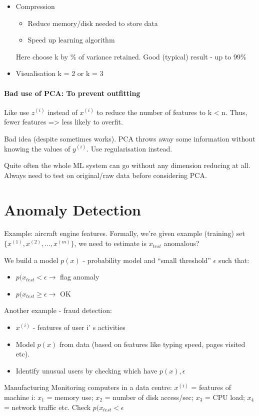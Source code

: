 \documentclass{scrartcl}
\begin{document}
\begin{itemize}
\item Compression
  \begin{itemize}
  \item Reduce memory/disk needed to store data
  \item Speed up learning algorithm
  \end{itemize}
  Here choose k by \% of variance retained. Good (typical) result - up
  to 99\%
\item Visualisation k = 2 or k = 3
\end{itemize}

\paragraph{Bad use of PCA: To prevent outfitting}

Like use $z^{(i)}$ instead of $x^{(i)}$ to reduce the number of
features to k < n. Thus, fewer features => less likely to overfit.

Bad idea (despite sometimes works). PCA throws away some information
without knowing the values of $y^{(i)}$. Use regularisation instead.

Quite often the whole ML system can go without any dimension reducing
at all. Always need to test on original/raw data before considering
PCA.

\section{Anomaly Detection}
\label{sec:15}

Example: aircraft engine features. Formally, we're given example
(training) set $\{ x^{(1)}, x^{(2)}, \dots, x^{(m)} \}$, we need to
estimate is $x_{test}$ anomalous?

We build a model $p(x)$ - probability model and ``small threshold''
$\epsilon$ such that:
\begin{itemize}
\item $p(x_{test} < \epsilon \rightarrow$ flag anomaly
\item $p(x_{test} \geq \epsilon \to$ OK
\end{itemize}

Another example - fraud detection:
\begin{itemize}
\item $x^{(i)}$ - features of user i' s activities
\item Model $p(x)$ from data (based on features like typing speed,
  pages visited etc).
\item Identify unusual users by checking which have $p(x) , \epsilon$
\end{itemize}
Manufacturing Monitoring computers in a data centre: $x^(i)$ =
features of machine i: $x_1$ = memory use; $x_2$ = number of disk
access/sec; $x_3$ = CPU load; $x_4$ = network traffic etc. Check
$p(x_{test} < \epsilon$
\end{document}
